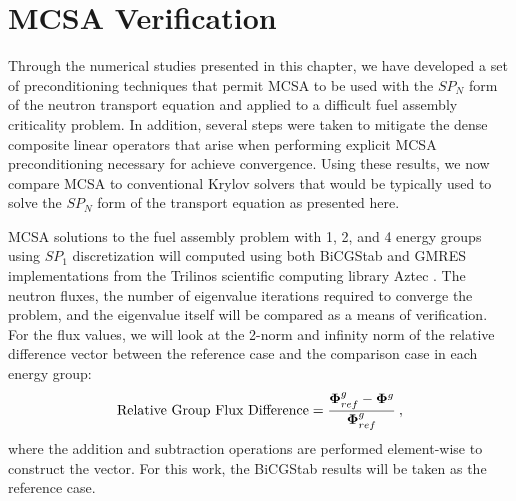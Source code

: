 \clearpage

\section{MCSA Verification\ }
\label{sec:spn_mcsa_verification}
Through the numerical studies presented in this chapter, we have
developed a set of preconditioning techniques that permit MCSA to be
used with the $SP_N$ form of the neutron transport equation and
applied to a difficult fuel assembly criticality problem. In addition,
several steps were taken to mitigate the dense composite linear
operators that arise when performing explicit MCSA preconditioning
necessary for achieve convergence. Using these results, we now compare
MCSA to conventional Krylov solvers that would be typically used to
solve the $SP_N$ form of the transport equation as presented here.

MCSA solutions to the fuel assembly problem with 1, 2, and 4 energy
groups using $SP_1$ discretization will computed using both BiCGStab
and GMRES implementations from the Trilinos scientific computing
library Aztec \cite{heroux_overview_2005}. The neutron fluxes, the
number of eigenvalue iterations required to converge the problem, and
the eigenvalue itself will be compared as a means of verification. For
the flux values, we will look at the 2-norm and infinity norm of the
relative difference vector between the reference case and the
comparison case in each energy group:
\begin{equation}
  \text{Relative Group Flux Difference} = \frac{\mathbf{\Phi}_{ref}^g -
    \mathbf{\Phi}^g}{\mathbf{\Phi}_{ref}^g}\:,
  \label{eq:relative_difference_vector}
\end{equation}
where the addition and subtraction operations are performed
element-wise to construct the vector. For this work, the BiCGStab
results will be taken as the reference case.

